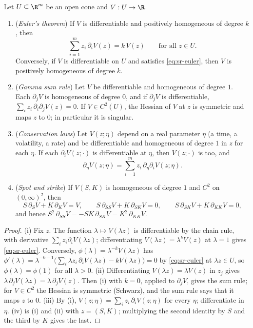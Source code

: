 \begin{proposition}\label{prop:sr-euler}
Let $U\subseteq\R^m$ be an open cone and $V:U\to\R$.
\begin{enumerate}[label=(\roman*)]
  \item (\emph{Euler's theorem}) If $V$ is differentiable and positively homogeneous of degree $k$, then
    \begin{equation}\label{eq:sr-euler}
      \sum_{i=1}^mz_i\,\partial_iV(z)=k\,V(z)\qquad\text{for all }z\in U.
    \end{equation}
    Conversely, if $V$ is differentiable on $U$ and satisfies \eqref{eq:sr-euler}, then $V$ is positively
    homogeneous of degree $k$.
  \item (\emph{Gamma sum rule}) Let $V$ be differentiable and homogeneous of degree $1$. Each $\partial_jV$ is
    homogeneous of degree $0$, and if $\partial_jV$ is differentiable, $\sum_iz_i\,\partial_i\partial_jV(z)=0$. If
    $V\in C^2(U)$, the Hessian of $V$ at $z$ is symmetric and maps $z$ to $0$; in particular it is singular.
  \item (\emph{Conservation laws}) Let $V(z;\eta)$ depend on a real parameter $\eta$ (a time, a volatility, a
    rate) and be differentiable and homogeneous of degree $1$ in $z$ for each $\eta$. If each $\partial_iV(z;\cdot)$
    is differentiable at $\eta$, then $V(z;\cdot)$ is too, and
    \begin{equation}\label{eq:sr-conservation}
      \partial_\eta V(z;\eta)=\sum_{i=1}^mz_i\,\partial_\eta\partial_iV(z;\eta).
    \end{equation}
  \item (\emph{Spot and strike}) If $V(S,K)$ is homogeneous of degree $1$ and $C^2$ on $(0,\infty)^2$, then
    \[
      S\,\partial_SV+K\,\partial_KV=V,\qquad S\,\partial_{SS}V+K\,\partial_{SK}V=0,\qquad S\,\partial_{SK}V+K\,\partial_{KK}V=0,
    \]
    and hence $S^2\,\partial_{SS}V=-SK\,\partial_{SK}V=K^2\,\partial_{KK}V$.
\end{enumerate}
\end{proposition}

\begin{proof}
(i) Fix $z$. The function $\lambda\mapsto V(\lambda z)$ is differentiable by the chain rule, with derivative
$\sum_iz_i\partial_iV(\lambda z)$; differentiating $V(\lambda z)=\lambda^kV(z)$ at $\lambda=1$ gives \eqref{eq:sr-euler}.
Conversely, $\phi(\lambda)=\lambda^{-k}V(\lambda z)$ has
$\phi'(\lambda)=\lambda^{-k-1}\big(\sum_i\lambda z_i\,\partial_iV(\lambda z)-kV(\lambda z)\big)=0$ by \eqref{eq:sr-euler} at
$\lambda z\in U$, so $\phi(\lambda)=\phi(1)$ for all $\lambda>0$.
(ii) Differentiating $V(\lambda z)=\lambda V(z)$ in $z_j$ gives $\lambda\,\partial_jV(\lambda z)=\lambda\,\partial_jV(z)$. Then (i)
with $k=0$, applied to $\partial_jV$, gives the sum rule; for $V\in C^2$ the Hessian is symmetric (Schwarz),
and the sum rule says that it maps $z$ to $0$.
(iii) By (i), $V(z;\eta)=\sum_iz_i\,\partial_iV(z;\eta)$ for every $\eta$; differentiate in $\eta$.
(iv) is (i) and (ii) with $z=(S,K)$; multiplying the second identity by $S$ and the third by $K$ gives the last.
\end{proof}

